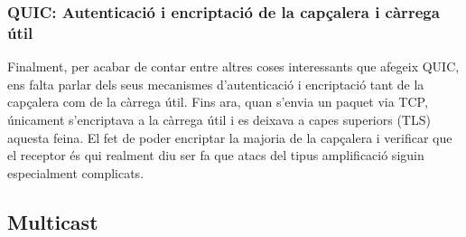 \subsubsection{QUIC: Autenticació i encriptació de la capçalera i càrrega útil}
{
    Finalment, per acabar de contar entre altres coses interessants que afegeix QUIC, ens falta parlar dels seus mecanismes d'autenticació i encriptació tant de
    la capçalera com de la càrrega útil. Fins ara, quan s'envia un paquet via TCP, únicament s'encriptava a la càrrega útil i es deixava a capes superiors (TLS)
    aquesta feina. El fet de poder encriptar la majoria de la capçalera i verificar que el receptor és qui realment diu ser fa que atacs del tipus amplificació siguin
    especialment complicats.
}

\subsection{Multicast}
